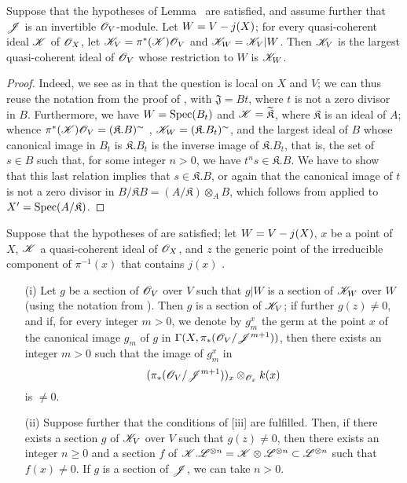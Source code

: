 \begin{corollary}[8.10.4]
\label{II.8.10.4}
Suppose that the hypotheses of Lemma~ are satisfied, and assume further that $\mathscr{J}$ is an invertible $\mathscr{O}_V$-module.
Let $W=V- j(X)$;
for every quasi-coherent ideal $\mathscr{K}$ of $\mathscr{O}_X$, let $\mathscr{K}_V=\pi^*(\mathscr{K})\mathscr{O}_V$ and $\mathscr{K}_W=\mathscr{K}_V|W$.
Then $\mathscr{K}_V$ is the largest quasi-coherent ideal of $\mathscr{O}_V$ whose restriction to $W$ is $\mathscr{K}_W$.
\end{corollary}

\begin{proof}
\label{proof-II.8.10.4}
Indeed, we see as in  that the question is local on $X$ and $V$;
we can thus reuse the notation from the proof of , with $\mathfrak{J}=Bt$, where $t$ is not a zero divisor in $B$.
Furthermore, we have $W=\operatorname{Spec}(B_t)$ and $\mathscr{K}=\widetilde{\mathfrak{K}}$, where $\mathfrak{K}$ is an ideal of $A$;
whence $\pi^*(\mathscr{K})\mathscr{O}_V=(\mathfrak{K}.B)^\sim$ , $\mathscr{K}_W=(\mathfrak{K}.B_t)^\sim$, and the largest ideal
of $B$ whose canonical image in $B_t$ is $\mathfrak{K}.B_t$ is the inverse image of $\mathfrak{K}.B_t$, that is, the set of $s\in B$ such that, for some integer $n>0$, we have $t^ns\in\mathfrak{K}.B$.
We have to show that this last relation implies that $s\in\mathfrak{K}.B$, or again that the canonical image of $t$ is not a zero divisor in $B/\mathfrak{K}B=(A/\mathfrak{K})\otimes_AB$, which follows from  applied to $X'=\operatorname{Spec}(A/\mathfrak{K})$.
\end{proof}

\begin{corollary}[8.10.5]
\label{II.8.10.5}
Suppose that the hypotheses of  are satisfied;
let $W=V- j(X)$, $x$ be a point of $X$, $\mathscr{K}$ a quasi-coherent ideal of $\mathscr{O}_X$, and $z$ the generic point of the irreducible component of $\pi^{-1}(x)$ that contains $j(x)$ .
\begin{enumerate}
    \item[\rm{(i)}] Let $g$ be a section of $\mathscr{O}_V$ over $V$ such that $g|W$ is a section of $\mathscr{K}_W$ over $W$ (using the notation from ).
        Then $g$ is a section of $\mathscr{K}_V$;
        if further $g(z)\neq0$, and if, for every integer $m>0$, we denote by $g_m^x$ the germ at the point $x$ of the canonical image $g_m$ of $g$ in $\Gamma(X,\pi_*(\mathscr{O}_V/\mathscr{J}^{m+1}))$, then there exists an integer $m>0$ such that the image of $g_m^x$ in
        \[
            (\pi_*(\mathscr{O}_V/\mathscr{J}^{m+1}))_x \otimes_{\mathscr{O}_x} k(x)
        \]
        is $\neq0$.
    \item[\rm{(ii)}] Suppose further that the conditions of [iii] are fulfilled.
        Then, if there exists a section $g$ of $\mathscr{K}_V$ over $V$ such that $g(z)\neq0$, then there exists an integer $n\geq0$ and a section $f$ of $\mathscr{K}.\mathscr{L}^{\otimes n}=\mathscr{K}\otimes\mathscr{L}^{\otimes n}\subset\mathscr{L}^{\otimes n}$ such that $f(x)\neq0$.
        If $g$ is a section of $\mathscr{J}$, we can take $n>0$.
\end{enumerate}
\end{corollary}

